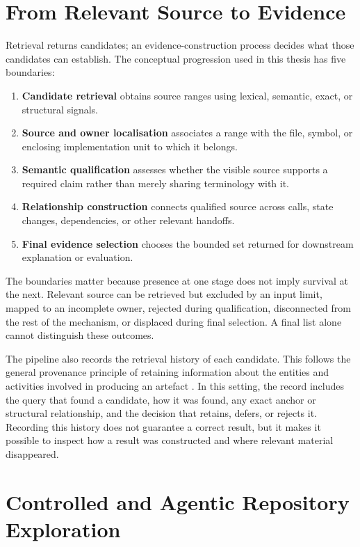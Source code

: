 \section{From Relevant Source to Evidence}\label{sec:from-relevant-source-to-evidence}

Retrieval returns candidates; an evidence-construction process decides what those candidates can establish. The conceptual progression used in this thesis has five boundaries:

\begin{enumerate}
\item \textbf{Candidate retrieval} obtains source ranges using lexical, semantic, exact, or structural signals.
\item \textbf{Source and owner localisation} associates a range with the file, symbol, or enclosing implementation unit to which it belongs.
\item \textbf{Semantic qualification} assesses whether the visible source supports a required claim rather than merely sharing terminology with it.
\item \textbf{Relationship construction} connects qualified source across calls, state changes, dependencies, or other relevant handoffs.
\item \textbf{Final evidence selection} chooses the bounded set returned for downstream explanation or evaluation.
\end{enumerate}

The boundaries matter because presence at one stage does not imply survival at the next. Relevant source can be retrieved but excluded by an input limit, mapped to an incomplete owner, rejected during qualification, disconnected from the rest of the mechanism, or displaced during final selection. A final list alone cannot distinguish these outcomes.

The pipeline also records the retrieval history of each candidate. This follows the general provenance principle of retaining information about the entities and activities involved in producing an artefact \cite{W3C2013PROV}. In this setting, the record includes the query that found a candidate, how it was found, any exact anchor or structural relationship, and the decision that retains, defers, or rejects it. Recording this history does not guarantee a correct result, but it makes it possible to inspect how a result was constructed and where relevant material disappeared.

\section{Controlled and Agentic Repository Exploration}\label{sec:controlled-and-agentic-repository-exploration}


